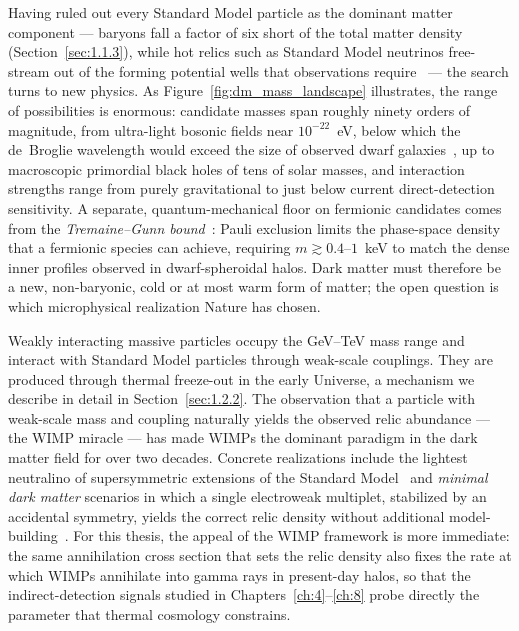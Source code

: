 Having ruled out every Standard Model particle as the dominant matter component --- baryons fall a factor of six short of the total matter density (Section~\ref{sec:1.1.3}), while hot relics such as Standard Model neutrinos free-stream out of the forming potential wells that observations require~\cite{Bullock:2017xww} --- the search turns to new physics.
As Figure~\ref{fig:dm_mass_landscape} illustrates, the range of possibilities is enormous: candidate masses span roughly ninety orders of magnitude, from ultra-light bosonic fields near $10^{-22}$~eV, below which the de~Broglie wavelength would exceed the size of observed dwarf galaxies~\cite{Hu:2000ke}, up to macroscopic primordial black holes of tens of solar masses, and interaction strengths range from purely gravitational to just below current direct-detection sensitivity.
A separate, quantum-mechanical floor on fermionic candidates comes from the \emph{Tremaine--Gunn bound}~\cite{Tremaine:1979we,Boyarsky:2018tvu}: Pauli exclusion limits the phase-space density that a fermionic species can achieve, requiring $m \gtrsim 0.4$--$1$~keV to match the dense inner profiles observed in dwarf-spheroidal halos.
Dark matter must therefore be a new, non-baryonic, cold or at most warm form of matter; the open question is which microphysical realization Nature has chosen.

Weakly interacting massive particles occupy the GeV--TeV mass range and interact with Standard Model particles through weak-scale couplings.
They are produced through thermal freeze-out in the early Universe, a mechanism we describe in detail in Section~\ref{sec:1.2.2}.
The observation that a particle with weak-scale mass and coupling naturally yields the observed relic abundance --- the WIMP miracle --- has made WIMPs the dominant paradigm in the dark matter field for over two decades.
Concrete realizations include the lightest neutralino of supersymmetric extensions of the Standard Model~\cite{Ellis:1983ew} and \emph{minimal dark matter} scenarios in which a single electroweak multiplet, stabilized by an accidental symmetry, yields the correct relic density without additional model-building~\cite{Cirelli:2005uq}.
For this thesis, the appeal of the WIMP framework is more immediate: the same annihilation cross section that sets the relic density also fixes the rate at which WIMPs annihilate into gamma rays in present-day halos, so that the indirect-detection signals studied in Chapters~\ref{ch:4}--\ref{ch:8} probe directly the parameter that thermal cosmology constrains.

